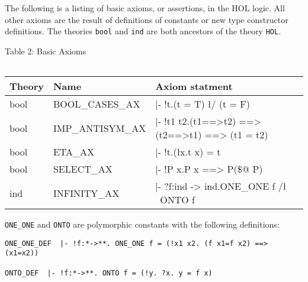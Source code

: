 The following is a listing of basic axioms, or assertions, in the HOL logic.
All other axioms are the result of definitions of constants or new type
constructor definitions.  The theories {\tt bool} and {\tt ind} are both
ancestors of the theory {\tt HOL}.
\begin{center} Table 2: Basic Axioms\\[10pt] \tt
\begin{tabular}{|l|l|l|} \hline
{\rm Theory} & {\rm Name} & {\rm Axiom statment}\\ \hline
bool & BOOL\_CASES\_AX & |- !t.(t = T) {\l}/ (t = F) \\
bool & IMP\_ANTISYM\_AX &
 |- !t1 t2.(t1==>t2) ==> (t2==>t1) ==> (t1 = t2) \\
bool & ETA\_AX & |- !t.({\l}x.t x) = t \\
bool & SELECT\_AX & |- !P x.P x ==> P(\$@ P) \\
ind & INFINITY\_AX & |- ?f:ind -> ind.ONE\_ONE f /{\l} ~ONTO f \\ \hline
\end{tabular}
\end{center}
{\tt ONE\_ONE} and {\tt ONTO} are polymorphic constants with the
following definitions:
\begin{verbatim}
ONE_ONE_DEF  |- !f:*->**. ONE_ONE f = (!x1 x2. (f x1=f x2) ==> (x1=x2))

ONTO_DEF  |- !f:*->**. ONTO f = (!y. ?x. y = f x)
\end{verbatim}

